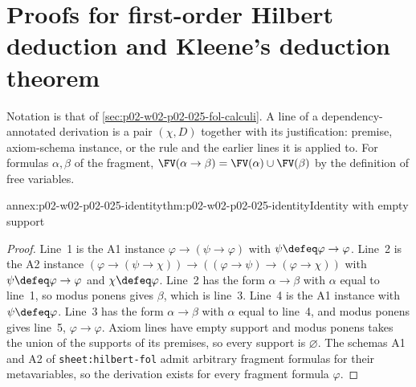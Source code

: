 \section{Proofs for first-order Hilbert deduction and Kleene's deduction theorem}
\label{sec:annex-p02-w02-p02-025-fol-calculi}

Notation is that of \cref{sec:p02-w02-p02-025-fol-calculi}.  A line of a
dependency-annotated derivation is a pair \((\chi,D)\) together with its
justification: premise, axiom-schema instance, or the rule and the earlier
lines it is applied to.  For formulas \(\alpha,\beta\) of the fragment,
\(\FV(\alpha\to\beta)=\FV(\alpha)\cup\FV(\beta)\) by the definition of free
variables.

\begin{annexitem}{annex:p02-w02-p02-025-identity}{thm:p02-w02-p02-025-identity}{Identity with empty support}
\begin{proof}
Line~1 is the A1 instance \(\varphi\to(\psi\to\varphi)\) with
\(\psi\defeq\varphi\to\varphi\).  Line~2 is the A2 instance
\((\varphi\to(\psi\to\chi))\to((\varphi\to\psi)\to(\varphi\to\chi))\) with
\(\psi\defeq\varphi\to\varphi\) and \(\chi\defeq\varphi\).  Line~2 has the
form \(\alpha\to\beta\) with \(\alpha\) equal to line~1, so modus ponens gives
\(\beta\), which is line~3.  Line~4 is the A1 instance with
\(\psi\defeq\varphi\).  Line~3 has the form \(\alpha\to\beta\) with \(\alpha\)
equal to line~4, and modus ponens gives line~5, \(\varphi\to\varphi\).
Axiom lines have empty support and modus ponens takes the union of the
supports of its premises, so every support is \(\varnothing\).  The schemas
A1 and A2 of \texttt{sheet:\allowbreak hilbert-fol} admit arbitrary fragment
formulas for their metavariables, so the derivation exists for every
fragment formula \(\varphi\).
\end{proof}
\end{annexitem}

